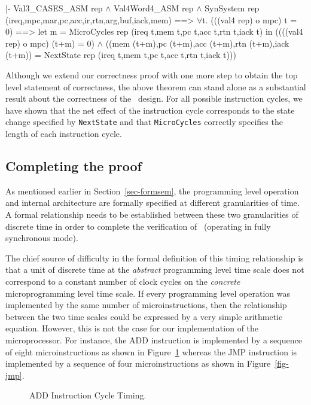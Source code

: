 \begintt
|- Val3_CASES_ASM rep \(\wedge\)
   Val4Word4_ASM rep \(\wedge\)
   SynSystem rep (ireq,mpc,mar,pc,acc,ir,rtn,arg,buf,iack,mem)
   ==>
   \(\forall\)t.
     (((val4 rep) o mpc) t = 0)
     ==>
     let m = MicroCycles rep (ireq t,mem t,pc t,acc t,rtn t,iack t) in
      ((((val4 rep) o mpc) (t+m) = 0) \(\wedge\)
       ((mem (t+m),pc (t+m),acc (t+m),rtn (t+m),iack (t+m)) =
        NextState rep (ireq t,mem t,pc t,acc t,rtn t,iack t)))
\endtt

Although we extend our correctness proof with one more step
to obtain the top level statement of correctness,
the above theorem can stand alone as a substantial result
about the correctness of the \Tamarack\ design.
For all possible instruction cycles,
we have shown that the net effect of the instruction cycle
corresponds to the state change specified by \verb"NextState"
and that \verb"MicroCycles" correctly specifies the length
of each instruction cycle.

\subsection{Completing the proof}
\label{sec-verfconcl}

As mentioned earlier in Section~\ref{sec-formsem},
the programming level operation and internal architecture
are formally specified at different granularities of time.
A formal relationship needs to be established between
these two granularities of discrete time in order to complete
the verification of \Tamarack\
(operating in fully synchronous mode).

The chief source of difficulty in
the formal definition of this timing relationship
is that a unit of
discrete time at the {\it abstract} programming level time scale
does not correspond to a constant number of clock cycles on the
{\it concrete} microprogramming level time scale.
If every programming level
operation was implemented by the same number of microinstructions,
then the relationship between the two time scales could be expressed
by a very simple arithmetic equation.
However, this is not the case for our implementation of the microprocessor.
For instance, the ADD instruction is implemented by a sequence of
eight microinstructions as shown in Figure~\ref{fig-add}
whereas the JMP instruction is implemented by
a sequence of four microinstructions as shown in Figure~\ref{fig-jmp}.

\begin{figure}
\begin{center}


\caption{ADD Instruction Cycle Timing.}
\label{fig-add}
\end{center}
\end{figure}

